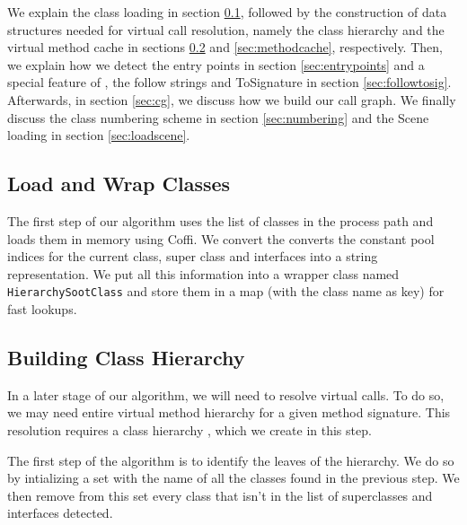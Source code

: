 \documentclass[preprint]{sigplanconf}
\begin{document}
We explain the class loading in section \ref{sec:loading}, followed by the construction of data structures needed for virtual call resolution, namely the class hierarchy and the virtual method cache in sections \ref{sec:classhierarchy} and \ref{sec:methodcache}, respectively. Then, we explain how we detect the entry points in section \ref{sec:entrypoints} and a special feature of \rb , the follow strings and ToSignature in section \ref{sec:followtosig}. Afterwards, in section \ref{sec:cg}, we discuss how we build our call graph. We finally discuss the class numbering scheme in section \ref{sec:numbering} and the Scene loading in section \ref{sec:loadscene}.

\subsection{Load and Wrap Classes}
\label{sec:loading}
The first step of our algorithm uses the list of classes in the process path and loads them in memory using Coffi. We convert the  converts the constant pool indices for the current class, super class and interfaces into a string representation. We put all this information into a wrapper class named {\tt HierarchySootClass} and store them in a map (with the class name as key) for fast lookups.

\subsection{Building Class Hierarchy}
\label{sec:classhierarchy}
In a later stage of our algorithm, we will need to resolve virtual calls. To do so, we may need entire virtual method hierarchy for a given method signature. This resolution requires a class hierarchy \cite{deanetal}, which we create in this step.

The first step of the algorithm is to identify the leaves of the hierarchy. We do so by intializing a set with the name of all the classes found in the previous step. We then remove from this set every class that isn't in the list of superclasses and interfaces detected.


\end{document}
